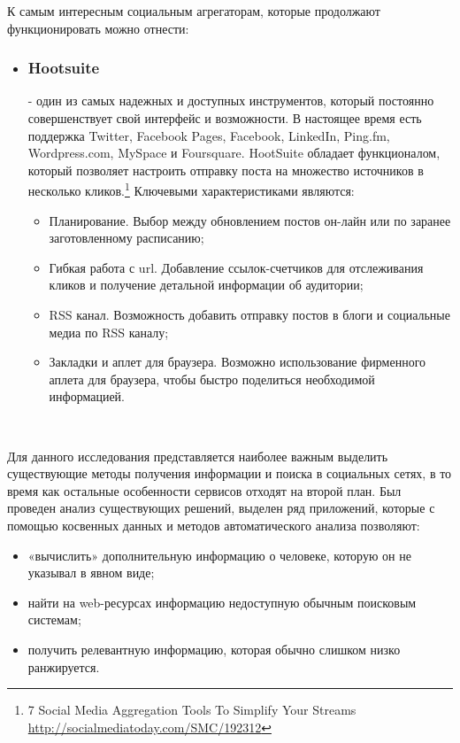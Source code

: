 \begin{itemize}
К самым интересным социальным агрегаторам, которые продолжают функционировать можно отнести:
\begin{itemize}
\item \subsubsection{Hootsuite} - один из самых надежных и доступных инструментов,  который постоянно совершенствует свой интерфейс и возможности. В настоящее время есть поддержка Twitter, Facebook Pages, Facebook, LinkedIn, Ping.fm, Wordpress.com, MySpace и Foursquare. HootSuite обладает функционалом, который позволяет настроить отправку поста на множество источников в несколько кликов.\footnote{7 Social Media Aggregation Tools To Simplify Your Streams  \url{http://socialmediatoday.com/SMC/192312}} Ключевыми характеристиками являются:
	\begin{itemize}
	\item  Планирование. Выбор между обновлением постов он-лайн или по заранее заготовленному расписанию;
	\item Гибкая работа с url. Добавление ссылок-счетчиков для отслеживания кликов и получение детальной информации об аудитории;
	\item  RSS канал. Возможность добавить отправку постов в блоги и социальные медиа по RSS каналу;
	\item Закладки и аплет для браузера. Возможно использование фирменного аплета для браузера, чтобы быстро поделиться необходимой информацией.
	\end{itemize}

\end{itemize}
\

Для данного исследования представляется наиболее важным выделить существующие методы получения информации и поиска в социальных сетях, в то время как остальные особенности сервисов отходят на второй план. Был проведен анализ существующих решений, выделен ряд приложений, которые с помощью косвенных данных и методов автоматического анализа позволяют:
\begin{itemize}
\item «вычислить» дополнительную информацию о человеке, которую он не указывал в явном виде; 
\item найти на web-ресурсах информацию недоступную обычным поисковым системам;
\item получить релевантную информацию, которая обычно слишком низко ранжируется. %
\end{itemize}



\end{itemize}
